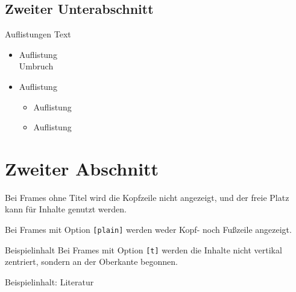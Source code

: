 \documentclass{sdqbeamer}
\begin{document}
\subsection{Zweiter Unterabschnitt}
\begin{frame}{Auflistungen}
	Text
	\begin{itemize}
		\item Auflistung\\ Umbruch
		\item Auflistung
		\begin{itemize}
			\item Auflistung
			\item Auflistung
		\end{itemize}
	\end{itemize}
\end{frame}

\section{Zweiter Abschnitt}

\begin{frame}
        Bei Frames ohne Titel wird die Kopfzeile nicht angezeigt, und  
    der freie Platz kann für Inhalte genutzt werden.
\end{frame}

\begin{frame}[plain]
    Bei Frames mit Option \texttt{[plain]} werden weder Kopf- noch Fußzeile angezeigt.
\end{frame}

\begin{frame}[t]{Beispielinhalt}
    Bei Frames mit Option \texttt{[t]} werden die Inhalte nicht vertikal zentriert, sondern an der Oberkante begonnen.
\end{frame}


\begin{frame}{Beispielinhalt: Literatur}
\end{frame}
\end{document}
